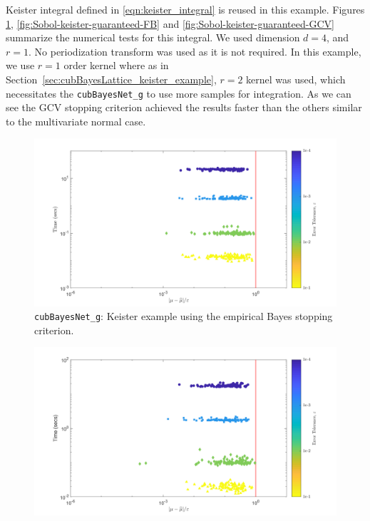 \documentclass{iitthesis}          %
\newcommand{\code}[1]{\texttt{#1}}
\newcommand\secref{Section~\ref}
\begin{document}
{{{{{{
Keister integral defined in \eqref{eqn:keister_integral} is reused in this example.
Figures \ref{fig:Sobol-keister-guaranteed-MLE}, \ref{fig:Sobol-keister-guaranteed-FB} and \ref{fig:Sobol-keister-guaranteed-GCV} summarize the numerical tests for this integral. We used  dimension $d=4$, and $r=1$.  No periodization transform was used as it is not required. 
In this example, we use $r=1$ order kernel where as in \secref{sec:cubBayesLattice_keister_example}, $r=2$ kernel was used, which necessitates
the \code{cubBayesNet\_g} to use more samples for integration.
As we can see the GCV stopping criterion achieved the results faster than the others similar to the multivariate normal case.

\begin{figure}
	\centering
	\includegraphics[width=0.95\linewidth]{"Sobol_Keister_guaranteed_time_MLE__d4_r1_2019-May-29"}
	\caption[Sobol: Keister guaranteed:MLE]{\code{cubBayesNet\_g}: Keister example using the empirical Bayes stopping criterion.}
	\label{fig:Sobol-keister-guaranteed-MLE}
\end{figure}
\begin{figure}
	\centering
	\includegraphics[width=0.95\linewidth]{"Sobol_Keister_guaranteed_time_full__d4_r1_2019-Jun-9"}

\end{figure}}}}}}}
\end{document}
